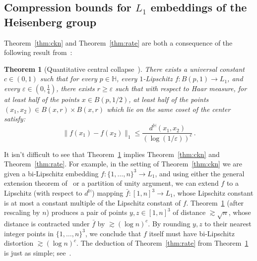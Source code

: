 \documentclass{icm2010}
\newtheorem{theorem}{Theorem}[section]
\theoremstyle{definition}
\newcommand{\1}{\mathbf{1}}
\renewcommand{\H}{\mathbb{H}}
\renewcommand{\ge}{\geqslant}
\renewcommand{\leq}{\leqslant}
\newcommand{\e}{\varepsilon}
\begin{document}
\subsection{Compression bounds for $L_1$ embeddings of the Heisenberg
group}\label{sec:compression} Theorem~\ref{thm:ckn} and
Theorem~\ref{thm:rate} are both a consequence of the following
result from~\cite{ckn}:
 \begin{theorem}[Quantitative central
 collapse~\cite{ckn}]\label{thm:quant}
\label{tmain} There exists a universal constant $c\in (0,1)$ such
that for every $p\in \H$, every $1$-Lipschitz $f:B(p,1)\to L_1$, and
every $\e\in \left(0,\frac14\right)$, there exists $r\ge \e$ such
that with respect to Haar measure, for at least half
 of the points $x\in B(p,1/2)$, at least half of
the points $(x_1,x_2)\in B(x,r)\times B(x,r)$ which lie on the same
coset of the center satisfy:
\begin{equation*}
\label{compression} \|f(x_1)-f(x_2)\|_{1}\leq
\frac{d^\H(x_1,x_2)}{(\log(1/\e))^c}\, .
\end{equation*}
\end{theorem}
It isn't difficult to see that Theorem~\ref{thm:quant} implies
Theorem~\ref{thm:ckn} and Theorem~\ref{thm:rate}. For example, in
the setting of Theorem~\ref{thm:ckn} we are given a bi-Lipschitz
embedding $f:\{1,\ldots,n\}^3\to L_1$, and using either the general
extension theorem of~\cite{LN05} or a partition of unity argument,
we can extend $f$ to a Lipschitz (with respect to $d^\H$) mapping
$\bar f:[1,n]^3\to L_1$, whose Lipschitz constant is at most a
constant multiple of the Lipschitz constant of $f$.
Theorem~\ref{thm:quant} (after rescaling by $n$)  produces a pair of
points $y,z\in [1,n]^3$ of distance $\gtrsim \sqrt{n}$, whose
distance is contracted under $\bar f$ by $\gtrsim (\log n)^c$. By
rounding $y,z$ to their nearest integer points in
$\{1,\ldots,n\}^3$, we conclude that $f$ itself must have
bi-Lipschitz distortion $\gtrsim (\log n)^c$. The deduction of
Theorem~\ref{thm:rate} from Theorem~\ref{thm:quant} is just as
simple; see~\cite{ckn}.
\end{document}
